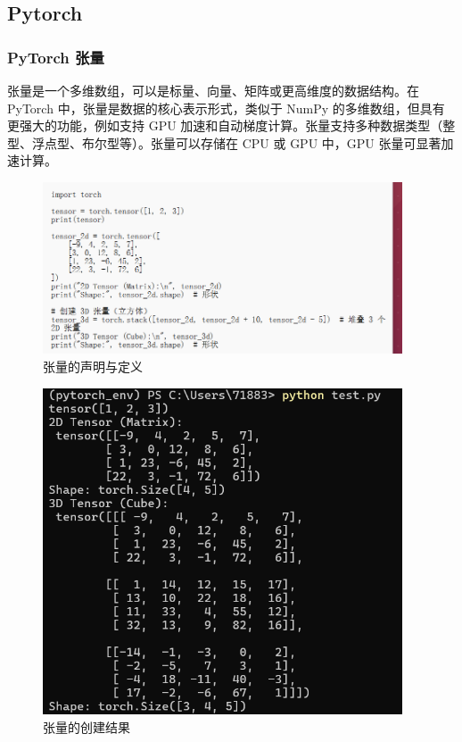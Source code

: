 \documentclass[UTF8]{ctexart}
\begin{document}
\subsection{Pytorch}

\subsubsection{PyTorch 张量} 
张量是一个多维数组，可以是标量、向量、矩阵或更高维度的数据结构。在 PyTorch 中，张量是数据的核心表示形式，类似于 NumPy 的多维数组，但具有更强大的功能，例如支持 GPU 加速和自动梯度计算。张量支持多种数据类型（整型、浮点型、布尔型等）。张量可以存储在 CPU 或 GPU 中，GPU 张量可显著加速计算。

\begin{figure}[H]
    \centering
    \includegraphics[width=0.95\textwidth]{picture/创建张量代码.png}%
    \caption{张量的声明与定义}
\end{figure}

\begin{figure}[H]
    \centering
    \includegraphics[width=0.95\textwidth]{picture/创建张量执行结果.png}%
    \caption{张量的创建结果}
\end{figure}
\end{document}
